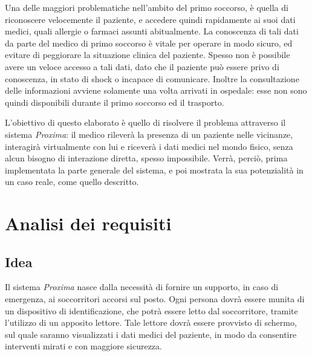 \documentclass[a4paper,12pt]{report}
\begin{document}
Una delle maggiori problematiche nell'ambito del primo soccorso, è quella di riconoscere velocemente il paziente, e accedere quindi rapidamente ai suoi dati medici, quali allergie o farmaci assunti abitualmente. La conoscenza di tali dati da parte del medico di primo soccorso è vitale per operare in modo sicuro, ed evitare di peggiorare la situazione clinica del paziente. Spesso non è possibile avere un veloce accesso a tali dati, dato che il paziente può essere privo di conoscenza, in stato di shock o incapace di comunicare. Inoltre la consultazione delle informazioni avviene solamente una volta arrivati in ospedale: esse non sono quindi disponibili durante il primo soccorso ed il trasporto.

L'obiettivo di questo elaborato è quello di risolvere il problema attraverso il sistema \emph{Proxima}: il medico rileverà la presenza di un paziente nelle vicinanze, interagirà virtualmente con lui e riceverà i dati medici nel mondo fisico, senza alcun bisogno di interazione diretta, spesso impossibile. Verrà, perciò, prima implementata la parte generale del sistema, e poi mostrata la sua potenzialità in un caso reale, come quello descritto.  

\chapter{Analisi dei requisiti} 
\section{Idea}
Il sistema \emph{Proxima} nasce dalla necessità di fornire un supporto, in caso di emergenza, ai soccorritori accorsi sul posto. Ogni persona dovrà essere munita di un dispositivo di identificazione, che potrà essere letto dal soccorritore, tramite l'utilizzo di un apposito lettore. Tale lettore dovrà essere provvisto di schermo, sul quale saranno visualizzati i dati medici del paziente, in modo da consentire interventi mirati e con maggiore sicurezza. 
\end{document}
